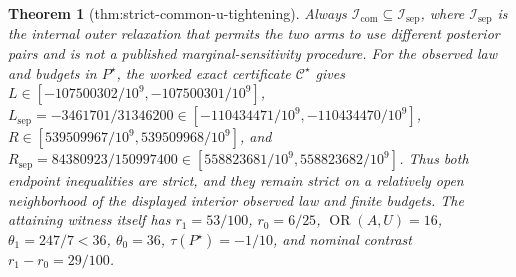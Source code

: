 \documentclass{article}
\newtheorem{theorem}{Theorem}
\begin{document}
\begin{theorem}[thm:strict-common-u-tightening]\label{thm:strict-common-u-tightening}
Always \(\mathcal I_{\mathrm{com}}\subseteq\mathcal I_{\mathrm{sep}}\), where \(\mathcal I_{\mathrm{sep}}\) is the internal outer relaxation that permits the two arms to use different posterior pairs and is not a published marginal-sensitivity procedure.  For the observed law and budgets in \(P^\star\), the worked exact certificate \(\mathcal C^\star\) gives \(L\in[-107500302/10^9,-107500301/10^9]\), \(L_{\mathrm{sep}}=-3461701/31346200\in[-110434471/10^9,-110434470/10^9]\), \(R\in[539509967/10^9,539509968/10^9]\), and \(R_{\mathrm{sep}}=84380923/150997400\in[558823681/10^9,558823682/10^9]\).  Thus both endpoint inequalities are strict, and they remain strict on a relatively open neighborhood of the displayed interior observed law and finite budgets.  The attaining witness itself has \(r_1=53/100\), \(r_0=6/25\), \(\operatorname{OR}(A,U)=16\), \(\theta_1=247/7<36\), \(\theta_0=36\), \(\tau(P^\star)=-1/10\), and nominal contrast \(r_1-r_0=29/100\).
\end{theorem}
\end{document}
